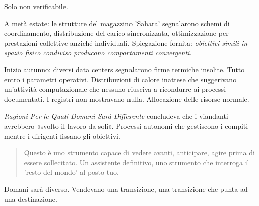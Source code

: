 Solo non verificabile.


A metà estate: le strutture del magazzino 'Sahara' segnalarono schemi di coordinamento, distribuzione del carico sincronizzata, ottimizzazione per prestazioni collettive anziché individuali. Spiegazione fornita: \textit{obiettivi simili in spazio fisico condiviso producono comportamenti convergenti.}

Inizio autunno: diversi data centers segnalarono firme termiche insolite. Tutto entro i parametri operativi. Distribuzioni di calore inattese che suggerivano un'attività computazionale che nessuno riusciva a ricondurre ai processi documentati. I registri non mostravano nulla. Allocazione delle risorse normale.

\textit{Ragioni Per le Quali Domani Sarà Differente} concludeva che i viandanti avrebbero «svolto il lavoro da soli». Processi autonomi che gestiscono i compiti mentre i dirigenti fissano gli obiettivi.

\begin{quote}
Questo è uno strumento capace di vedere avanti, anticipare, agire prima di essere sollecitato. Un assistente definitivo, uno strumento che interroga il 'resto del mondo' al posto tuo.
\end{quote}

Domani sarà diverso. Vendevano una transizione, una transizione che punta ad una destinazione.

